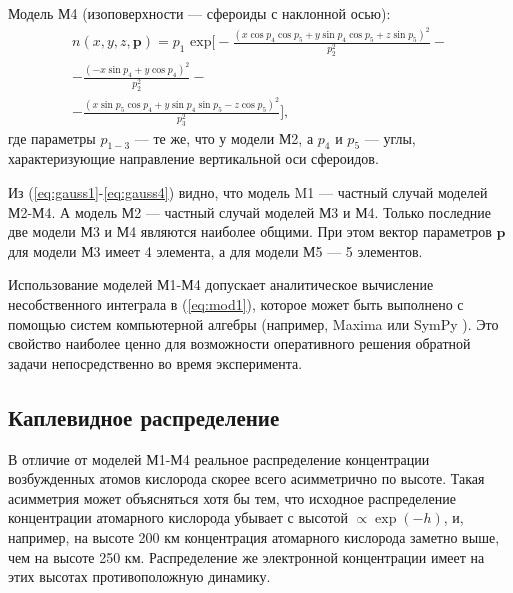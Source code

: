 \documentclass[12pt,a4paper]{article}
\renewcommand{\vec}{\mathbf}
\begin{document}
Модель М4 (изоповерхности --- сфероиды с наклонной осью):
\begin{equation}\label{eq:gauss4}
\begin{split}
n(x,y,z,\vec{p})=p_1 \text{ exp} \bigg[ 
-\frac{(x\cos{p_4}\cos{p_5} + y\sin{p_4}\cos{p_5} + z\sin{p_5})^2}{p_2^2}-\\
-\frac{(-x\sin{p_4} + y\cos{p_4})^2}{p_2^2} -\\ 
-\frac{(x\sin{p_5}\cos{p_4} + y\sin{p_4}\sin{p_5} - z\cos{p_5})^2}{p_3^2}\bigg],
\end{split}
\end{equation}
где параметры $p_{1-3}$ --- те же, что у модели М2, а $p_4$ и $p_5$ --- углы, характеризующие направление вертикальной оси сфероидов.

Из (\ref{eq:gauss1}-\ref{eq:gauss4}) видно, что модель M1 --- частный случай моделей М2-М4. А модель М2 --- частный случай моделей М3 и М4. Только последние две модели М3 и М4 являются наиболее общими. При этом вектор параметров $\vec{p}$ для модели М3 имеет 4 элемента, а для модели М5 --- 5 элементов.

Использование моделей М1-М4 допускает аналитическое вычисление несобственного интеграла в (\ref{eq:mod1}), которое может быть выполнено с помощью систем компьютерной алгебры (например, Maxima \cite{Maxima} или SymPy \cite{SymPy}). Это свойство наиболее ценно для возможности оперативного решения обратной задачи непосредственно во время эксперимента. 

\subsection{Каплевидное распределение} \label{subsec:model2}
В отличие от моделей М1-М4 реальное распределение концентрации возбужденных атомов кислорода скорее всего асимметрично по высоте. Такая асимметрия может объясняться хотя бы тем, что исходное распределение концентрации атомарного кислорода убывает с высотой $\propto \exp {(-h)}$, и, например, на высоте 200 км концентрация атомарного кислорода заметно выше, чем на высоте 250 км. Распределение же электронной концентрации имеет на этих высотах противоположную динамику.
\end{document}

